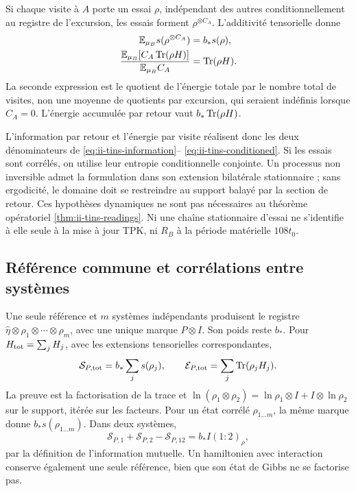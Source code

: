 Si chaque visite à $A$ porte un essai $\rho$, indépendant des autres
conditionnellement au registre de l’excursion, les essais forment
$\rho^{\otimes C_A}$. L’additivité tensorielle donne
\begin{align}
 \mathbb E_{\mu_B}s(\rho^{\otimes C_A})&=b_*s(\rho),\nonumber\\
 \frac{\mathbb E_{\mu_B}[C_A\operatorname{Tr}(\rho H)]}
      {\mathbb E_{\mu_B}C_A}&=\operatorname{Tr}(\rho H).
 \label{eq:ii-tins-visit-readings}
\end{align}
La seconde expression est le quotient de l’énergie totale par le nombre total de visites,
non une moyenne de quotients par excursion, qui seraient indéfinis lorsque
$C_A=0$. L’énergie accumulée par retour vaut $b_*\operatorname{Tr}(\rho H)$.

L’information par retour et l’énergie par visite réalisent donc
les deux dénominateurs de \eqref{eq:ii-tins-information}--
\eqref{eq:ii-tins-conditioned}. Si les essais sont corrélés,
on utilise leur entropie conditionnelle conjointe. Un processus non inversible admet
la formulation dans son extension bilatérale stationnaire ; sans ergodicité,
le domaine doit se restreindre au support balayé par la section de retour.
Ces hypothèses dynamiques ne sont pas nécessaires au théorème opératoriel
\ref{thm:ii-tins-readings}. Ni une chaîne stationnaire d’essai ne s’identifie
à elle seule à la mise à jour TPK, ni $R_B$ à la période matérielle
$108t_0$.

\subsection{Référence commune et corrélations entre systèmes}
\label{subsec:ii-tins-comun}

Une seule référence et $m$ systèmes indépendants produisent le registre
$\widehat\eta\otimes\rho_1\otimes\cdots\otimes\rho_m$, avec une
unique marque $P\otimes I$. Son poids reste $b_*$. Pour
$H_{\rm tot}=\sum_jH_j$, avec les extensions tensorielles correspondantes,
\begin{equation}
 \mathcal S_{P,\rm tot}=b_*\sum_js(\rho_j),\qquad
 \mathcal E_{P,\rm tot}=\sum_j\operatorname{Tr}(\rho_jH_j).
 \label{eq:ii-tins-common}
\end{equation}
La preuve est la factorisation de la trace et
$\ln(\rho_1\otimes\rho_2)=\ln\rho_1\otimes I+I\otimes\ln\rho_2$
sur le support, itérée sur les facteurs. Pour un état corrélé
$\rho_{1\ldots m}$, la même marque donne $b_*s(\rho_{1\ldots m})$. Dans deux
systèmes,
\begin{equation}
 \mathcal S_{P,1}+\mathcal S_{P,2}-\mathcal S_{P,12}
 =b_*I(1:2)_\rho,
 \label{eq:ii-tins-mutual}
\end{equation}
par la définition de l’information mutuelle. Un hamiltonien avec interaction
conserve également une seule référence, bien que son état de Gibbs ne se factorise pas.

